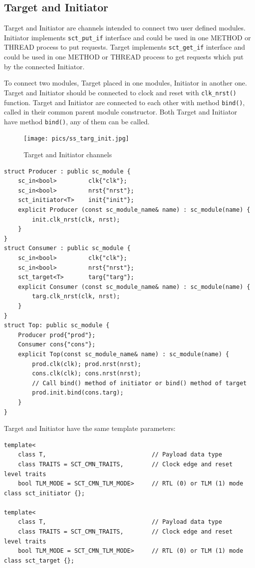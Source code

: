 \subsection{Target and Initiator}\label{section:sct_targ_init}

Target and Initiator are channels intended to connect two user defined modules. Initiator implements {\tt sct\_put\_if} interface and could be used in one METHOD or THREAD process to put requests. Target implements {\tt sct\_get\_if} interface and could be used in one METHOD or THREAD process to get requests which put by the connected Initiator.

To connect two modules, Target placed in one modules, Initiator in another one. Target and Initiator should be connected to clock and reset with {\tt clk\_nrst()} function. Target and Initiator are connected to each other with method {\tt bind()}, called in their common parent module constructor. Both Target and Initiator have method {\tt bind()}, any of them can be called.

\begin{figure}[!htb]
\centering
\texttt{[image: pics/ss\_targ\_init.jpg]}
\caption{Target and Initiator channels}
\label{fig:ss_usage}
\end{figure}

\begin{lstlisting}[style=mycpp]
struct Producer : public sc_module {
    sc_in<bool>         clk{"clk"};
    sc_in<bool>         nrst{"nrst"};
    sct_initiator<T>    init{"init"};
    explicit Producer (const sc_module_name& name) : sc_module(name) {
        init.clk_nrst(clk, nrst);
    } 
}
struct Consumer : public sc_module {
    sc_in<bool>         clk{"clk"};
    sc_in<bool>         nrst{"nrst"};
    sct_target<T>       targ{"targ"};
    explicit Consumer (const sc_module_name& name) : sc_module(name) {
        targ.clk_nrst(clk, nrst);
    } 
}
struct Top: public sc_module {
    Producer prod{"prod"};
    Consumer cons{"cons"};
    explicit Top(const sc_module_name& name) : sc_module(name) {
        prod.clk(clk); prod.nrst(nrst);
        cons.clk(clk); cons.nrst(nrst);
        // Call bind() method of initiator or bind() method of target
        prod.init.bind(cons.targ);  
    }
}
\end{lstlisting}

Target and Initiator have the same template parameters:
\begin{lstlisting}[style=mycpp]
template<
    class T,                              // Payload data type 
    class TRAITS = SCT_CMN_TRAITS,        // Clock edge and reset level traits
    bool TLM_MODE = SCT_CMN_TLM_MODE>     // RTL (0) or TLM (1) mode
class sct_initiator {};

template<
    class T,                              // Payload data type 
    class TRAITS = SCT_CMN_TRAITS,        // Clock edge and reset level traits
    bool TLM_MODE = SCT_CMN_TLM_MODE>     // RTL (0) or TLM (1) mode
class sct_target {};
\end{lstlisting}

